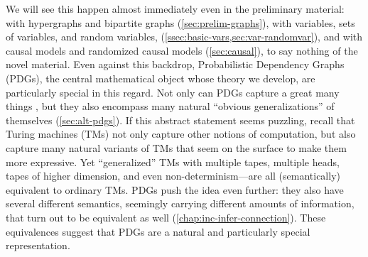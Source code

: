%
We will see this happen almost immediately even in the preliminary material: with hypergraphs and bipartite graphs (\cref{sec:prelim-graphs}), with variables, sets of variables, and random variables, (\cref{ssec:basic-vars,sec:var-randomvar}), and with causal models and randomized causal models (\cref{sec:causal}),
to say nothing of the novel material. 
%
Even against this backdrop,
Probabilistic Dependency Graphs (PDGs), the central mathematical object whose theory we develop, are particularly special in this regard. 
Not only can PDGs capture a great many things 
\unskip, but they also encompass many natural ``obvious generalizations'' of themselves (\cref{sec:alt-pdgs}). 
If this abstract statement seems puzzling, recall that Turing machines (TMs) not only capture other notions of computation, but also capture many natural variants of TMs that seem on the surface to make them more expressive.  
Yet ``generalized'' TMs with multiple tapes, multiple heads, tapes of higher dimension, and even non-determinism---are all (semantically) equivalent to ordinary TMs. 
%
PDGs push the idea even further:
they also have several different semantics, seemingly carrying different amounts of information, that turn out to be equivalent as well (\cref{chap:inc-infer-connection}). 
These equivalences suggest that PDGs are a
natural and particularly special
representation. 


